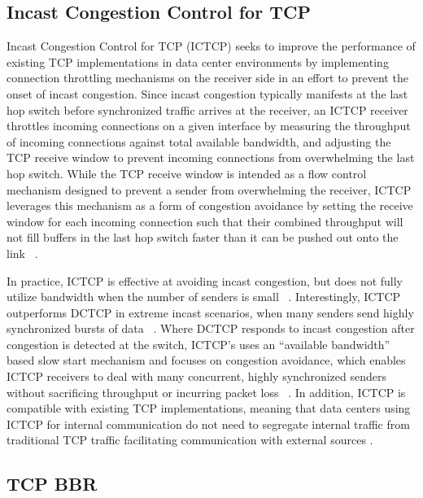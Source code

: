 \subsection{Incast Congestion Control for TCP}

Incast Congestion Control for TCP (ICTCP) seeks to improve the performance of existing TCP implementations in data center environments by implementing connection throttling mechanisms on the receiver side in an effort to prevent the onset of incast congestion. Since incast congestion typically manifests at the last hop switch before synchronized traffic arrives at the receiver, an ICTCP receiver throttles incoming connections on a given interface by measuring the throughput of incoming connections against total available bandwidth, and adjusting the TCP receive window to prevent incoming connections from overwhelming the last hop switch. While the TCP receive window is intended as a flow control mechanism designed to prevent a sender from overwhelming the receiver, ICTCP leverages this mechanism as a form of congestion avoidance by setting the receive window for each incoming connection such that their combined throughput will not fill buffers in the last hop switch faster than it can be pushed out onto the link ~\cite{wu_ictcp:_2013}. 

In practice, ICTCP is effective at avoiding incast congestion, but does not fully utilize bandwidth when the number of senders is small ~\cite{wu_ictcp:_2013}. Interestingly, ICTCP outperforms DCTCP in extreme incast scenarios, when many senders send highly synchronized bursts of data ~\cite{wu_ictcp:_2013, alizadeh_data_2010}. Where DCTCP responds to incast congestion after congestion is detected at the switch, ICTCP's uses an ``available bandwidth'' based slow start mechanism and focuses on congestion avoidance, which enables ICTCP receivers to deal with many concurrent, highly synchronized senders without sacrificing throughput or incurring packet loss ~\cite{alizadeh_data_2010, wu_ictcp:_2013}. In addition, ICTCP is compatible with existing TCP implementations, meaning that data centers using ICTCP for internal communication do not need to segregate internal traffic from traditional TCP traffic facilitating communication with external sources \cite{wu_ictcp:_2013}.

\subsection{TCP BBR}

